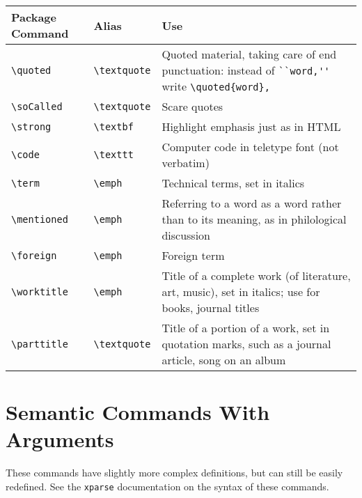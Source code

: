 \documentclass{article}
\begin{document}
\begin{center}
\begin{tabularx}{\linewidth}{llX}
\toprule
Package Command & Alias & Use\\
\midrule
\verb|\quoted| & \verb|\textquote| & Quoted material, taking care of end punctuation: instead of \verb|``word,''| write \verb|\quoted{word},|\\
\verb|\soCalled| & \verb|\textquote| & Scare quotes\\
\verb|\strong| & \verb|\textbf| & Highlight emphasis just as in HTML\\
\verb|\code| & \verb|\texttt| & Computer code in teletype font (not verbatim)\\
\verb|\term| & \verb|\emph| & Technical terms, set in italics\\
\verb|\mentioned| & \verb|\emph| & Referring to a word as a word rather than to its meaning, as in philological discussion\\
\verb|\foreign| & \verb|\emph| & Foreign term\\
\verb|\worktitle| & \verb|\emph| & Title of a complete work (of literature, art, music), set in italics; use for books, journal titles\\
\verb|\parttitle| & \verb|\textquote| & Title of a portion of a work, set in quotation marks, such as a journal article, song on an album\\
\bottomrule
\end{tabularx}
\end{center}

\section{Semantic Commands With Arguments}

These commands have slightly more complex definitions, but can still be easily redefined.
See the \texttt{xparse} documentation on the syntax of these commands.
\end{document}
